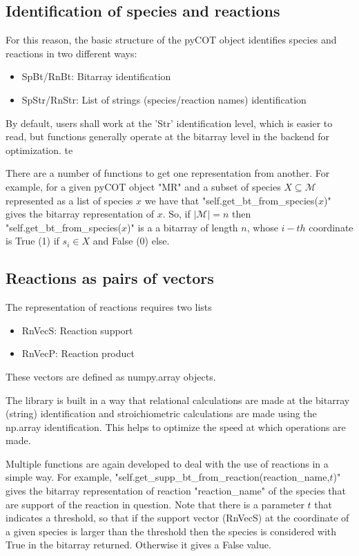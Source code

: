 \documentclass[12pt]{article}
\newcommand{\Ms}{\mathcal{M}}
\begin{document}
\subsection{Identification of species and reactions}
For this reason, the basic structure of the pyCOT object identifies species and reactions in two different ways:
\begin{itemize}
\item SpBt/RnBt: Bitarray identification
\item SpStr/RnStr: List of strings (species/reaction names) identification 
\end{itemize}

By default, users shall work at the 'Str' identification level, which is easier to read, but functions generally operate at the bitarray level in the backend for optimization. te

There are a number of functions to get one representation from another. For example, for a given pyCOT object "MR" and a subset of species $X\subseteq \Ms$ represented as a list of species $x$ we have that "self.get\_bt\_from\_species($x$)" gives the bitarray representation of $x$. So, if $|\Ms|=n$ then "self.get\_bt\_from\_species($x$)" is a a bitarray of length $n$, whose $i-th$ coordinate is True (1) if $s_i\in X$ and False (0) else.
\subsection{Reactions as pairs of vectors}
The representation of reactions requires two lists
\begin{itemize}
\item RnVecS: Reaction support
\item RnVecP: Reaction product 
\end{itemize}

These vectors are defined as numpy.array objects.

The library is built in a way that relational calculations are made at the bitarray (string) identification and stroichiometric calculations are made using the np.array identification. This helps to optimize the speed at which operations are made.

Multiple functions are again developed to deal with the use of reactions in a simple way. For example, "self.get\_supp\_bt\_from\_reaction(reaction\_name,$t$)" gives the bitarray representation of reaction "reaction\_name" of the species that are support of the reaction in question. Note that there is a parameter $t$ that indicates a threshold, so that if the support vector (RnVecS) at the coordinate of a given species is larger than the threshold then
the species is considered with True in the bitarray returned. Otherwise it gives a False value.
\end{document}
